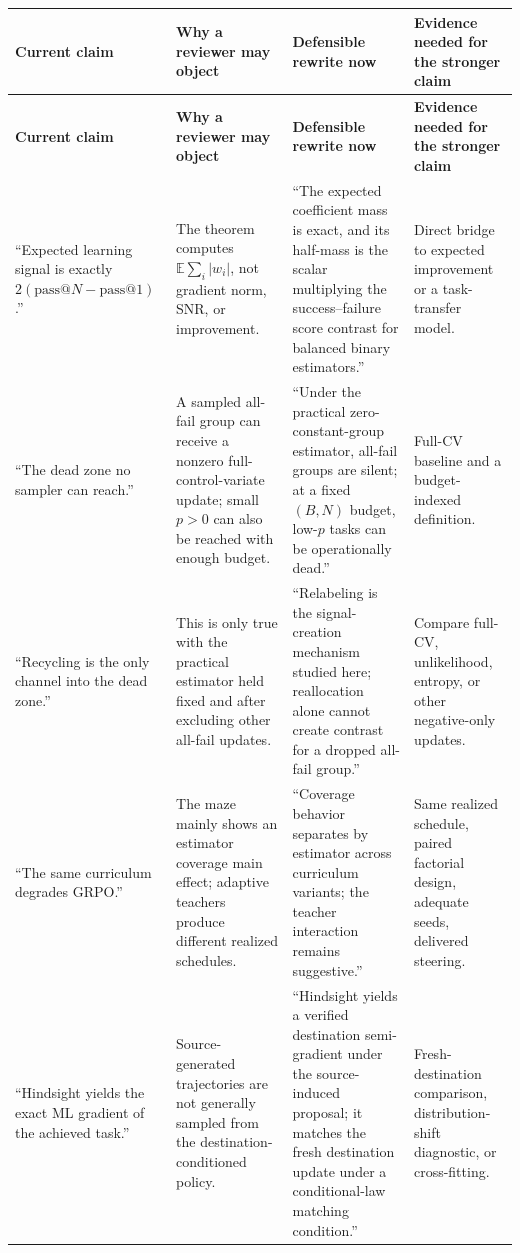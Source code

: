 \documentclass[11pt]{article}
\makeatletter
\newcommand{\E}{\mathbb{E}}
\newcommand{\PassAt}[1]{\mathrm{pass@}#1}
\theoremstyle{definition}
\theoremstyle{remark}
\makeatother
\begin{document}
\small
\begin{longtable}{p{}p{}p{}p{}}
\toprule
\textbf{Current claim} & \textbf{Why a reviewer may object} & \textbf{Defensible rewrite now} & \textbf{Evidence needed for the stronger claim}\\
\midrule
\endfirsthead
\toprule
\textbf{Current claim} & \textbf{Why a reviewer may object} & \textbf{Defensible rewrite now} & \textbf{Evidence needed for the stronger claim}\\
\midrule
\endhead
``Expected learning signal is exactly $2(\PassAt{N}-\PassAt{1})$.'' & The theorem computes $\E\sum_i|w_i|$, not gradient norm, SNR, or improvement. & ``The expected coefficient mass is exact, and its half-mass is the scalar multiplying the success--failure score contrast for balanced binary estimators.'' & Direct bridge to expected improvement or a task-transfer model.\\
\addlinespace
``The dead zone no sampler can reach.'' & A sampled all-fail group can receive a nonzero full-control-variate update; small $p>0$ can also be reached with enough budget. & ``Under the practical zero-constant-group estimator, all-fail groups are silent; at a fixed $(B,N)$ budget, low-$p$ tasks can be operationally dead.'' & Full-CV baseline and a budget-indexed definition.\\
\addlinespace
``Recycling is the only channel into the dead zone.'' & This is only true with the practical estimator held fixed and after excluding other all-fail updates. & ``Relabeling is the signal-creation mechanism studied here; reallocation alone cannot create contrast for a dropped all-fail group.'' & Compare full-CV, unlikelihood, entropy, or other negative-only updates.\\
\addlinespace
``The same curriculum degrades GRPO.'' & The maze mainly shows an estimator coverage main effect; adaptive teachers produce different realized schedules. & ``Coverage behavior separates by estimator across curriculum variants; the teacher interaction remains suggestive.'' & Same realized schedule, paired factorial design, adequate seeds, delivered steering.\\
\addlinespace
``Hindsight yields the exact ML gradient of the achieved task.'' & Source-generated trajectories are not generally sampled from the destination-conditioned policy. & ``Hindsight yields a verified destination semi-gradient under the source-induced proposal; it matches the fresh destination update under a conditional-law matching condition.'' & Fresh-destination comparison, distribution-shift diagnostic, or cross-fitting.\\

\end{longtable}
\end{document}
